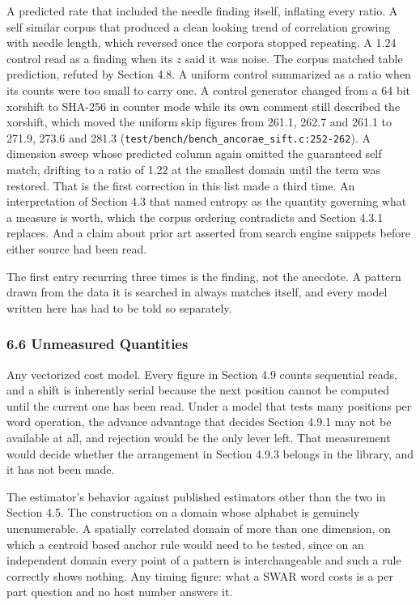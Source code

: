 A predicted rate that included the needle finding itself, inflating every ratio. A self similar corpus that produced a clean looking trend of correlation growing with needle length, which reversed once the corpora stopped repeating. A 1.24 control read as a finding when its \(z\) said it was noise. The corpus matched table prediction, refuted by Section 4.8. A uniform control summarized as a ratio when its counts were too small to carry one. A control generator changed from a 64 bit xorshift to SHA-256 in counter mode while its own comment still described the xorshift, which moved the uniform skip figures from 261.1, 262.7 and 261.1 to 271.9, 273.6 and 281.3 (\texttt{test/\allowbreak{}bench/\allowbreak{}bench\_\allowbreak{}ancorae\_\allowbreak{}sift.\allowbreak{}c:252-\allowbreak{}262}). A dimension sweep whose predicted column again omitted the guaranteed self match, drifting to a ratio of 1.22 at the smallest domain until the term was restored. That is the first correction in this list made a third time. An interpretation of Section 4.3 that named entropy as the quantity governing what a measure is worth, which the corpus ordering contradicts and Section 4.3.1 replaces. And a claim about prior art asserted from search engine snippets before either source had been read.

The first entry recurring three times is the finding, not the anecdote. A pattern drawn from the data it is searched in always matches itself, and every model written here has had to be told so separately.

\subsubsection{6.6 Unmeasured Quantities}

Any vectorized cost model. Every figure in Section 4.9 counts sequential reads, and a shift is inherently serial because the next position cannot be computed until the current one has been read. Under a model that tests many positions per word operation, the advance advantage that decides Section 4.9.1 may not be available at all, and rejection would be the only lever left. That measurement would decide whether the arrangement in Section 4.9.3 belongs in the library, and it has not been made.

The estimator's behavior against published estimators other than the two in Section 4.5. The construction on a domain whose alphabet is genuinely unenumerable. A spatially correlated domain of more than one dimension, on which a centroid based anchor rule would need to be tested, since on an independent domain every point of a pattern is interchangeable and such a rule correctly shows nothing. Any timing figure: what a SWAR word costs is a per part question and no host number answers it.

